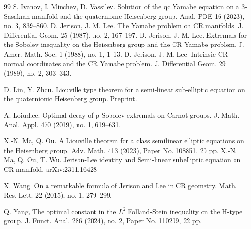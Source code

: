 \documentclass[reqno,12pt]{amsart}
\numberwithin{equation}{section}
\theoremstyle{plain}
\theoremstyle{definition}
\begin{document}
\begin{thebibliography}{99}
S. Ivanov, I. Minchev, D. Vassilev.
Solution of the qc Yamabe equation on a 3-Sasakian manifold and the quaternionic Heisenberg group. Anal. PDE   16 (2023), no. 3, 839–860.
D. Jerison, J. M. Lee.
The Yamabe problem on CR manifolds.
J. Differential Geom.   25 (1987), no. 2, 167–197.
D. Jerison, J. M. Lee.
Extremals for the Sobolev inequality on the Heisenberg group and the CR Yamabe problem.
J. Amer. Math. Soc.   1 (1988), no. 1, 1–13.
D. Jerison, J. M. Lee.
Intrinsic CR normal coordinates and the CR Yamabe problem.
J. Differential Geom.   29 (1989), no. 2, 303–343.

 D. Lin, Y. Zhou. Liouville type theorem for a semi-linear sub-elliptic equation on the quaternionic Heisenberg group. Preprint.


A. Loiudice.
Optimal decay of p-Sobolev extremals on Carnot groups.
J. Math. Anal. Appl.   470 (2019), no. 1, 619–631.


X.-N. Ma, Q. Ou.
A Liouville theorem for a class semilinear elliptic equations on the Heisenberg group.
Adv. Math.   413 (2023), Paper No. 108851, 20 pp.
X.-N. Ma, Q. Ou, T. Wu. Jerison-Lee identity and Semi-linear subelliptic equation on CR manifold. arXiv:2311.16428

X. Wang.
On a remarkable formula of Jerison and Lee in CR geometry.
Math. Res. Lett.   22 (2015), no. 1, 279–299.


Q. Yang,
The optimal constant in the $L^2$ Folland-Stein inequality on the H-type group.
J. Funct. Anal. 286 (2024), no. 2, Paper No. 110209, 22 pp.
\end{thebibliography}
\end{document}
